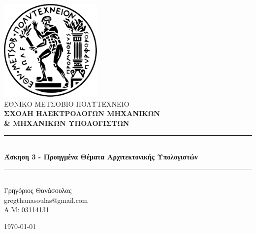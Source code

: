 \documentclass[12pt]{article}
\begin{document}
\sloppy
\begin{titlepage}



\newcommand{\HRule}{\rule{\linewidth}{0.5mm}}
\center
\includegraphics[width=50mm,scale=0.5]{imgs/logo.png}\\[1cm]
\textsc{\LARGE ΕΘΝΙΚΟ ΜΕΤΣΟΒΙΟ ΠΟΛΥΤΕΧΝΕΙΟ}\\[0.05cm] %
\textsc{\textbf{\Large ΣΧΟΛΗ ΗΛΕΚΤΡΟΛΟΓΩΝ ΜΗΧΑΝΙΚΩΝ \\ \& ΜΗΧΑΝΙΚΩΝ ΥΠΟΛΟΓΙΣΤΩΝ}}\\[1.cm] %

\vspace{05mm}
\HRule \\[0.4cm]
{ \huge \bfseries Άσκηση 3 - Προηγμένα Θέματα Αρχιτεκτονικής Υπολογιστών }\\[0.4cm] 
\HRule \\[1.5cm]
 
\center
{\Large Γρηγόριος Θανάσουλας \\ \vspace{1em} gregthanasoulas@gmail.com \\ \vspace{5mm} \Large A.M: 03114131} \\
\vspace{15mm}

{\large \today} %
\vfill

\end{titlepage}
\newpage
\tableofcontents
\newpage
\end{document}
